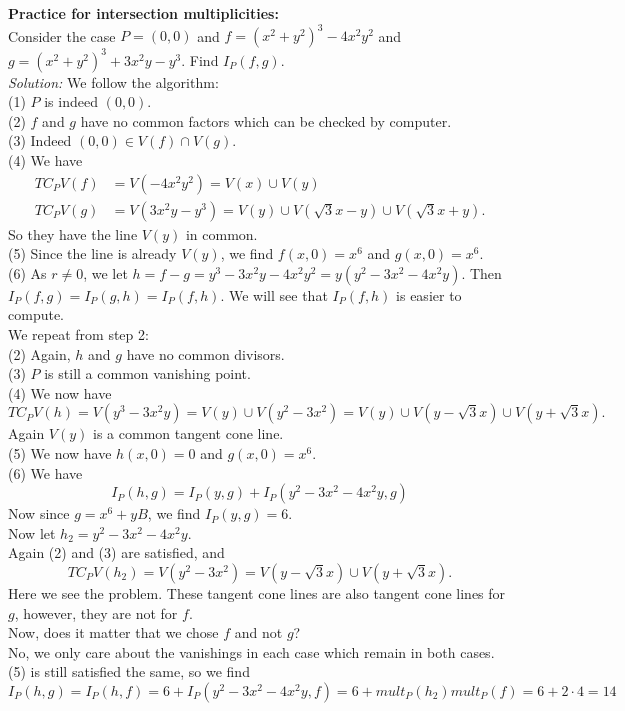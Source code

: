\documentclass[a4paper]{article}
\begin{document}
\textbf{Practice for intersection multiplicities:}\\
\linebreak
Consider the case $P = (0,0)$ and 
$f= (x^2 + y^2)^3 - 4x^2 y^2$ and
$g = (x^2 + y^2)^3 +3x^2 y -y^3$. Find
$I_P (f,g)$.\\
\linebreak
\textit{Solution:} We follow the algorithm:\\
(1) $P$ is indeed $(0,0)$.\\
(2) $f$ and $g$ have no common factors which can be checked by computer.\\
(3) Indeed $(0,0) \in V(f) \cap V(g)$.\\
(4) We have
\begin{align*}
    TC_P V(f) &= V(-4x^2 y^2) = V(x) \cup V(y)\\
    TC_P V(g) &= V(3x^2 y - y^3)
    = V(y) \cup V(\sqrt{3} x-y) \cup V\left( \sqrt{3} x + y \right).
\end{align*}
So they have the line $V(y)$ in common.\\
(5) Since the line is already $V(y)$, we find
$f(x,0) = x^{6}$ and $g(x,0) = x^{6}$.\\
\linebreak
(6) As $r \neq 0$, we let $h = f-g = y^3 - 3x^2 y - 4x^2 y^2 
= y \left( y^2 - 3x^2 - 4x^2 y \right) $. Then
$I_P(f,g) = I_P(g,h) = I_P(f,h)$. We will see that
$I_P(f,h)$ is easier to compute.\\
\linebreak
We repeat from step 2:\\
(2) Again,  $h$ and $g$ have no common divisors.\\
(3) $P$ is still a common vanishing point.\\
(4) We now have
\[
TC_P V(h) = V\left( y^3 - 3x^2 y \right) 
= V(y) \cup V\left( y^2 - 3x^2 \right) 
= V(y) \cup V(y - \sqrt{3} x) \cup V\left( y + \sqrt{3} x \right).
\] 
Again $V(y)$ is a common tangent cone line.\\
(5) We now have $h(x,0) = 0$ and $g(x,0) = x^6$.\\
(6) We have
\[
I_P(h,g) = I_P(y, g) + I_P (y^2 - 3x^2 - 4x^2 y, g)
\] 
Now since  $g = x^{6} + y B$, we find
$I_P(y,g) = 6$.\\
Now let $h_2 = y^2 - 3x^2 - 4x^2 y$.\\
Again (2) and (3) are satisfied, and
\[
TC_P V(h_2) = V\left( y^2 - 3x^2 \right) 
= V(y - \sqrt{3} x) \cup V(y + \sqrt{3} x).
\] 
Here we see the problem. These tangent cone lines are also tangent cone lines
for $g$, however, they are not for $f$.\\
Now, does it matter that we chose $f$ and not $g$?\\
No, we only care about the vanishings in each case which remain in both cases.
(5) is still satisfied the same, so we find
 \[
I_P (h,g) = I_P(h,f) = 6 + I_P (y^2 - 3x^2 - 4x^2 y, f)
= 6 + mult_P (h_2) mult_P(f) = 6 + 2\cdot 4 = 14
\] 
\end{document}

